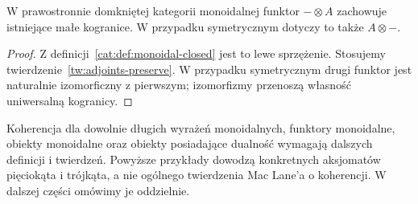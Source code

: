 \begin{stwierdzenie}\label{cat:prop:closed-colimits}
W prawostronnie domkniętej kategorii monoidalnej funktor $-\otimes A$ zachowuje istniejące małe kogranice. W przypadku symetrycznym dotyczy to także $A\otimes-$.
\end{stwierdzenie}
\begin{proof}
Z definicji~\ref{cat:def:monoidal-closed} jest to lewe sprzężenie. Stosujemy twierdzenie~\ref{tw:adjoints-preserve}. W przypadku symetrycznym drugi funktor jest naturalnie izomorficzny z pierwszym; izomorfizmy przenoszą własność uniwersalną kogranicy.
\end{proof}

\begin{uwaga}
Koherencja dla dowolnie długich wyrażeń monoidalnych, funktory monoidalne, obiekty monoidalne oraz obiekty posiadające dualność wymagają dalszych definicji i twierdzeń. Powyższe przykłady dowodzą konkretnych aksjomatów pięciokąta i trójkąta, a nie ogólnego twierdzenia Mac Lane'a o koherencji. W dalszej części omówimy je oddzielnie.
\end{uwaga}
